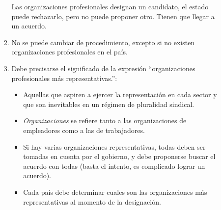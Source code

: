 \documentclass[spanish,12pt,a4paper,titlepage]{report}
\begin{document}
\begin{itemize}
\begin{itemize}
\begin{enumerate}
    Las organizaciones profesionales designan un candidato, el estado puede rechazarlo, pero no puede proponer otro. Tienen que llegar a un acuerdo.
  \item No se puede cambiar de procedimiento, excepto si no existen organizaciones profesionales en el país.
  \item Debe precisarse el significado de la expresión “organizaciones profesionales más representativas.”:
    \begin{itemize}
    \item Aquellas que aspiren a ejercer la representación en cada sector y que son inevitables en un régimen de pluralidad sindical.
    \item \textit{Organizaciones} se refiere tanto a las organizaciones de empleadores como a las de trabajadores.
    \item Si hay varias organizaciones representativas, todas deben ser tomadas en cuenta por el gobierno, y debe proponerse buscar el acuerdo con todas (basta el intento, es complicado lograr un acuerdo).
    \item Cada país debe determinar cuales son las organizaciones más representativas al momento de la designación.


\end{itemize}
\end{enumerate}
\end{itemize}
\end{itemize}
\end{document}
